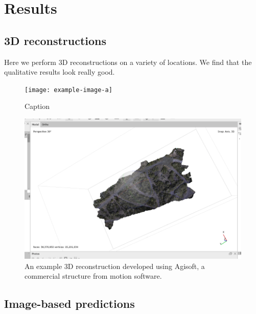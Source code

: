 \chapter{Results} \label{chapResults}
\section{3D reconstructions}
Here we perform 3D reconstructions on a variety of locations. We find that the qualitative results look really good. 

\begin{figure}
    \centering
    \texttt{[image: example-image-a]}
    \caption{Caption}
    \label{fig:3d_reconstrction}
\end{figure}

\begin{figure}
    \centering
    \includegraphics[width=\textwidth]{figs/results/3d_reconstruction.png}
    \caption{An example 3D reconstruction developed using Agisoft, a commercial structure from motion software.}
    \label{fig:3d_reconstrction}
\end{figure}

\section{Image-based predictions}
